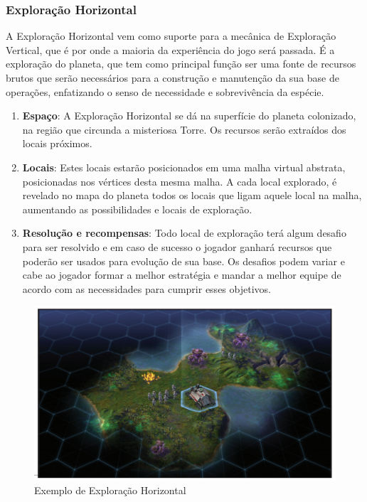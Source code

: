 \documentclass[11pt]{article} %
\begin{document}
\subsubsection{Exploração Horizontal}
A Exploração Horizontal vem como suporte para a mecânica de Exploração Vertical, que é por onde a maioria da experiência do jogo será passada. É a exploração do planeta, que tem como principal função ser uma fonte de recursos brutos que serão necessários para a construção e manutenção da sua base de operações, enfatizando o senso de necessidade e sobrevivência da espécie.

\begin{enumerate}
  \item \textbf{Espaço}: A Exploração Horizontal se dá na superfície do planeta colonizado, na região que circunda a misteriosa Torre. Os recursos serão extraídos dos locais próximos.
  \item \textbf{Locais}: Estes locais estarão posicionados em uma malha virtual abstrata, posicionadas nos vértices desta mesma malha. A cada local explorado, é revelado no mapa do planeta todos os locais que ligam aquele local na malha, aumentando as possibilidades e locais de exploração.
  \item \textbf{Resolução e recompensas}: Todo local de exploração terá algum desafio para ser resolvido e em caso de sucesso o jogador ganhará recursos que poderão ser usados para evolução de sua base. Os desafios podem variar e cabe ao jogador formar a melhor estratégia e mandar a melhor equipe de acordo com as necessidades para cumprir esses objetivos.
\end{enumerate}

\begin{figure}[!htp]
\centering
\includegraphics[scale=0.3]{res/resources.png}
\caption{Exemplo de Exploração Horizontal}
\label{Exemplo de Exploração Horizontal}
\end{figure}
\end{document}
